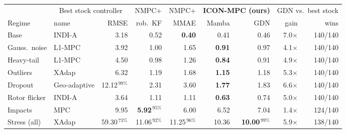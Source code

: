 \begin{tabular}{l l r r r r r r r}
\toprule
 & \multicolumn{2}{c}{Best stock controller} & NMPC+ & NMPC+ & \multicolumn{2}{c}{\textbf{ICON-MPC (ours)}} & \multicolumn{2}{c}{GDN vs.\ best stock} \\
\cmidrule(lr){2-3}\cmidrule(lr){6-7}\cmidrule(lr){8-9}
Regime & name & RMSE & rob.\ KF & MMAE & Mamba & GDN & gain & wins \\
\midrule
Base & INDI-A & 3.18 & 0.52 & \textbf{0.40} & 0.41 & 0.46 & 7.0$\times$ & 140/140 \\
Gauss.\ noise & L1-MPC & 3.92 & 1.00 & 1.65 & \textbf{0.91} & 0.97 & 4.1$\times$ & 140/140 \\
Heavy-tail & L1-MPC & 4.50 & 0.98 & 1.26 & \textbf{0.84} & 0.91 & 4.9$\times$ & 140/140 \\
Outliers & XAdap & 6.32 & 1.19 & 1.68 & \textbf{1.15} & 1.18 & 5.3$\times$ & 140/140 \\
Dropout & Geo-adaptive & 12.12$^{\,99\%}$ & 2.31 & 3.60 & \textbf{1.77} & 1.83 & 6.6$\times$ & 140/140 \\
Rotor flicker & INDI-A & 3.64 & 1.11 & 1.11 & \textbf{0.63} & 0.74 & 5.0$\times$ & 140/140 \\
Impacts & MPC & 9.95 & \textbf{5.92$^{\,95\%}$} & 6.00 & 6.52 & 7.04 & 1.4$\times$ & 124/140 \\
Stress (all) & XAdap & 59.30$^{\,73\%}$ & 11.06$^{\,92\%}$ & 11.25$^{\,96\%}$ & 10.36 & \textbf{10.00$^{\,99\%}$} & 5.9$\times$ & 138/140 \\
\bottomrule
\end{tabular}

